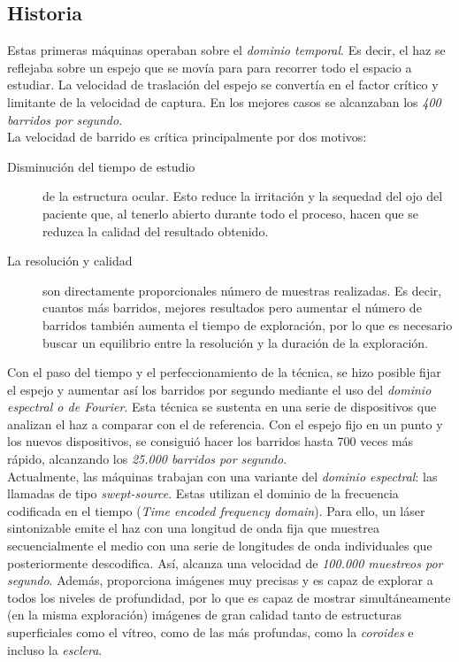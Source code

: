\subsection{Historia}\label{tco:historia}
Estas primeras máquinas operaban sobre el \emph{dominio temporal}. Es
decir, el haz se reflejaba sobre un espejo que se movía para para
recorrer todo el espacio a estudiar. La velocidad de traslación del
espejo se convertía en el factor crítico y limitante de la velocidad
de
captura. En los mejores casos se alcanzaban los \emph{400 barridos por segundo}.\\
La velocidad de barrido es crítica principalmente por dos motivos:
\begin{description}
\item [Disminución del tiempo de estudio] de la estructura
  ocular. Esto reduce la irritación y la sequedad del ojo del paciente
  que, al tenerlo abierto durante todo el proceso, hacen que se
  reduzca la calidad del resultado obtenido.
\item [La resolución y calidad] son directamente proporcionales número
  de muestras realizadas. Es decir, cuantos más barridos, mejores
  resultados pero aumentar el número de barridos también aumenta el
  tiempo de exploración, por lo que es necesario buscar un equilibrio
  entre la resolución y la duración de la exploración.
\end{description}
Con el paso del tiempo y el perfeccionamiento de la técnica, se hizo
posible fijar el espejo y aumentar así los barridos por segundo
mediante el uso del \emph{dominio espectral o de Fourier}. Esta
técnica se sustenta en una serie de dispositivos que analizan el haz a
comparar con el de referencia. Con el espejo fijo en un punto y los
nuevos dispositivos, se consiguió hacer los barridos hasta 700 veces
más rápido, alcanzando los \emph{25.000 barridos por segundo}.\\
Actualmente, las máquinas trabajan con una variante del \emph{dominio
  espectral}: las llamadas de tipo \emph{swept-source}. Estas utilizan
el dominio de la frecuencia codificada en el tiempo (\emph{Time
  encoded frequency domain}). Para ello, un láser sintonizable emite
el haz con una longitud de onda fija que muestrea secuencialmente el
medio con una serie de longitudes de onda individuales que
posteriormente descodifica. Así, alcanza una velocidad de
\emph{100.000 muestreos por segundo}. Además, proporciona imágenes muy
precisas y es capaz de explorar a todos los niveles de profundidad,
por lo que es capaz de mostrar simultáneamente (en la misma
exploración) imágenes de gran calidad tanto de estructuras
superficiales como el vítreo, como de las más profundas, como la
\emph{\gls{coroides}} e incluso la \emph{\gls{esclera}}.

